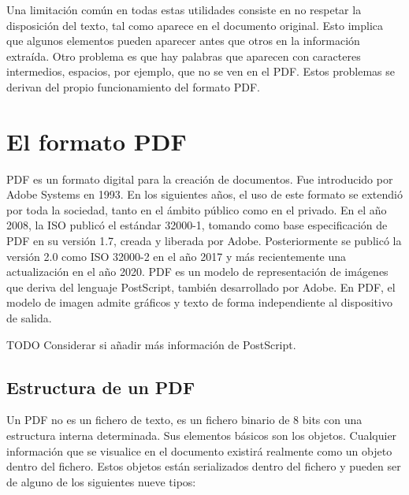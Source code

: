 Una limitación común en todas estas utilidades consiste en no respetar la disposición del texto, tal como aparece en el documento original. Esto implica que algunos elementos pueden aparecer antes que otros en la información extraída. Otro problema es que hay palabras que aparecen con caracteres intermedios, espacios, por ejemplo, que no se ven en el PDF. Estos problemas se derivan del propio funcionamiento del formato PDF.

\section{El formato PDF}

PDF es un formato digital para la creación de documentos. Fue introducido por Adobe Systems en 1993. En los siguientes años, el uso de este formato se extendió por toda la sociedad, tanto en el ámbito público como en el privado. En el año 2008, la ISO publicó el estándar 32000-1, tomando como base especificación de PDF en su versión 1.7, creada y liberada por Adobe. Posteriormente se publicó la versión 2.0 como ISO 32000-2 en el año 2017 y más recientemente una actualización en el año 2020. PDF es un modelo de representación de imágenes que deriva del lenguaje PostScript, también desarrollado por Adobe. En PDF, el modelo de imagen admite gráficos y texto de forma independiente al dispositivo de salida.

TODO Considerar si añadir más información de PostScript.

\subsection{Estructura de un PDF}

Un PDF no es un fichero de texto, es un fichero binario de 8 bits con una estructura interna determinada. Sus elementos básicos son los objetos. Cualquier información que se visualice en el documento existirá realmente como un objeto dentro del fichero. Estos objetos están serializados dentro del fichero y pueden ser de alguno de los siguientes nueve tipos:

